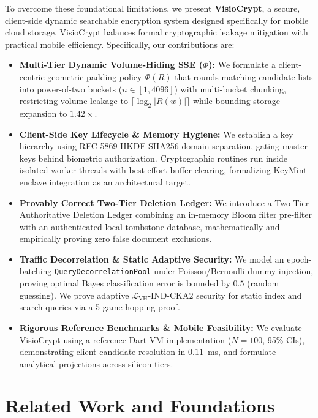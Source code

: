 \documentclass[10pt,conference]{IEEEtran}
\begin{document}
To overcome these foundational limitations, we present \textbf{VisioCrypt}, a secure, client-side dynamic searchable encryption system designed specifically for mobile cloud storage. VisioCrypt balances formal cryptographic leakage mitigation with practical mobile efficiency. Specifically, our contributions are:
\begin{itemize}\setlength{\itemsep}{1pt}\setlength{\parskip}{0pt}
    \item \textbf{Multi-Tier Dynamic Volume-Hiding SSE ($\Phi$):} We formulate a client-centric geometric padding policy $\Phi(R)$ that rounds matching candidate lists into power-of-two buckets ($n \in [1, 4096]$) with multi-bucket chunking, restricting volume leakage to $\lceil \log_2 |R(w)| \rceil$ while bounding storage expansion to $1.42\times$.
    \item \textbf{Client-Side Key Lifecycle \& Memory Hygiene:} We establish a key hierarchy using RFC 5869 HKDF-SHA256 domain separation, gating master keys behind biometric authorization. Cryptographic routines run inside isolated worker threads with best-effort buffer clearing, formalizing KeyMint enclave integration as an architectural target.
    \item \textbf{Provably Correct Two-Tier Deletion Ledger:} We introduce a Two-Tier Authoritative Deletion Ledger combining an in-memory Bloom filter pre-filter with an authenticated local tombstone database, mathematically and empirically proving zero false document exclusions.
    \item \textbf{Traffic Decorrelation \& Static Adaptive Security:} We model an epoch-batching \texttt{QueryDecorrelationPool} under Poisson/Bernoulli dummy injection, proving optimal Bayes classification error is bounded by $0.5$ (random guessing). We prove adaptive $\mathcal{L}_{\text{VH}}\text{-IND-CKA2}$ security for static index and search queries via a 5-game hopping proof.
    \item \textbf{Rigorous Reference Benchmarks \& Mobile Feasibility:} We evaluate VisioCrypt using a reference Dart VM implementation ($N=100$, 95\% CIs), demonstrating client candidate resolution in $0.11$~ms, and formulate analytical projections across silicon tiers.
\end{itemize}

\section{Related Work and Foundations}
\end{document}

